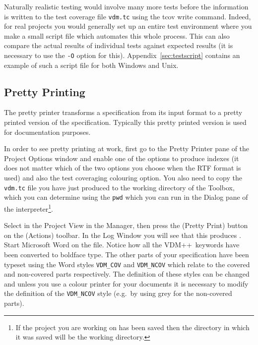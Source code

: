 \documentclass[\pformat,12pt]{article}
\newcommand{\vdmslpp}{VDM++}
\newcommand{\Toolbox}{Toolbox}
\newcommand{\guicmd}[1]{{\sf #1}}
\begin{document}
Naturally realistic testing would involve many more tests before the
information is written to the test coverage file \texttt{vdm.tc} using the
\guicmd{tcov write} command. Indeed, for
real projects you would generally set up an entire test environment 
where you make a small script file which automates this whole
process. This can also compare the actual results of individual tests
against expected results (it is necessary to use the {\tt -O} option
for this).  Appendix~\ref{sec:testscript} contains an example of such
a script file for both Windows and Unix.


\subsection{Pretty Printing}\label{subsec:pp}


The pretty printer transforms a specification from its input format to
a pretty printed version of the specification. Typically this pretty
printed version is used for documentation purposes.

In order to see pretty printing at work, first go to the \guicmd{Pretty
Printer} pane of the \guicmd{Project Options} window and enable one of the
options to produce indexes (it does not matter which of the 
two options you choose when the RTF format is used) and also the test
coveraging colouring option. You also need to copy the {\tt vdm.tc}
file you have just produced to the working directory of the
\Toolbox, which you can determine using the {\tt pwd}
which you can run in the \guicmd{Dialog} pane of the
interpreter\footnote{If the project you are working on has been saved
  then the directory in which it was saved will be the working
  directory.}.

Select  in the \guicmd{Project View} in the
\guicmd{Manager}, then press the %
(\guicmd{Pretty Print}) button on the
(\guicmd{Actions}) toolbar. In the \guicmd{Log Window} you will
see that this produces . Start Microsoft Word on the
file. Notice how all the \vdmslpp\ keywords have been converted to
boldface type. The
other parts of your specification have been typeset using the Word
styles {\tt VDM\_COV} and {\tt VDM\_NCOV} which relate to the covered
and non-covered parts respectively. The definition of these styles can
be changed and unless you use a colour printer for your documents it
is necessary to modify the definition of the {\tt VDM\_NCOV} style
(e.g.\ by using grey for the non-covered parts).
\end{document}
